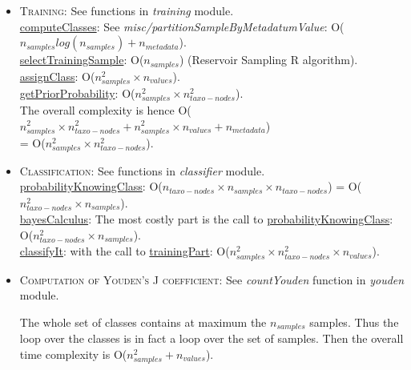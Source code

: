 \documentclass{report}
\begin{document}
\begin{itemize}
\item \textsc{Training:} See functions in \emph{training} module.\\

\uline{computeClasses}: See \emph{misc/partitionSampleByMetadatumValue}: O($n_{samples}log(n_{samples}) + n_{metadata}$).\\

\uline{selectTrainingSample}: O($n_{samples}$) (Reservoir Sampling R algorithm).\\

\uline{assignClass}: O($n_{samples}^{2} \times n_{values}$).\\

\uline{getPriorProbability}: O($n_{samples}^{2} \times n_{taxo-nodes}^{2}$).\\

The overall complexity is hence O($n_{samples}^{2} \times n_{taxo-nodes}^{2} + n_{samples}^{2} \times n_{values} + n_{metadata}$)\\
 = O($n_{samples}^{2} \times n_{taxo-nodes}^{2}$). \\

\item \textsc{Classification:} See functions in \emph{classifier} module.\\

\uline{probabilityKnowingClass}: O($n_{taxo-nodes} \times n_{samples} \times n_{taxo-nodes}$) = O($n_{taxo-nodes}^{2} \times n_{samples}$).\\

\uline{bayesCalculus}: The most costly part is the call to \uline{probabilityKnowingClass}: O($n_{taxo-nodes}^{2} \times n_{samples}$). \\

\uline{classifyIt}: with the call to \uline{trainingPart}: O($n_{samples}^{2} \times n_{taxo-nodes}^{2} \times n_{values}$).\\

\item \textsc{Computation of Youden's J coefficient:} See \emph{countYouden} function in \emph{youden} module.

The whole set of classes contains at maximum the $n_{samples}$ samples. Thus the loop over the classes is in fact a loop over the set of samples. Then the overall time complexity is O($n_{samples}^{2} + n_{values}$).\\

\end{itemize}
\end{document}
